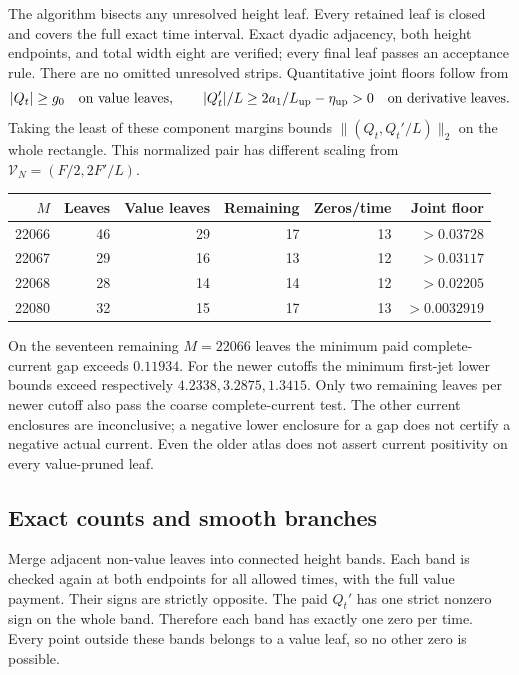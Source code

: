\documentclass[11pt]{article}
\numberwithin{equation}{section}
\theoremstyle{definition}
\theoremstyle{remark}
\begin{document}
The algorithm bisects any unresolved height leaf. Every retained leaf
is closed and covers the full exact time interval. Exact dyadic
adjacency, both height endpoints, and total width eight are verified;
every final leaf passes an acceptance rule. There are no omitted
unresolved strips. Quantitative joint floors follow from
\begin{equation}
 |Q_t|\ge g_0\quad\hbox{on value leaves},\qquad
 |Q_t'|/L\ge 2a_1/L_{\rm up}-\eta_{\rm up}>0
       \quad\hbox{on derivative leaves}.
 \label{eq:joint-floor}
\end{equation}
Taking the least of these component margins bounds
$\|(Q_t,Q_t'/L)\|_2$ on the whole rectangle. This normalized pair
has different scaling from $\mathcal V_N=(F/2,2F'/L)$.

\begin{center}
\small
\begin{tabular}{rrrrrr}
\toprule
$M$ & Leaves & Value leaves & Remaining & Zeros/time & Joint floor\\
\midrule
22066 & 46 & 29 & 17 & 13 & $>0.03728$\\
22067 & 29 & 16 & 13 & 12 & $>0.03117$\\
22068 & 28 & 14 & 14 & 12 & $>0.02205$\\
22080 & 32 & 15 & 17 & 13 & $>0.0032919$\\
\bottomrule
\end{tabular}
\end{center}
On the seventeen remaining $M=22066$ leaves the minimum paid
complete-current gap exceeds $0.11934$. For the newer cutoffs the
minimum first-jet lower bounds exceed respectively
$4.2338,3.2875,1.3415$. Only two remaining leaves per newer cutoff
also pass the coarse complete-current test. The other current
enclosures are inconclusive; a negative lower enclosure for a gap
does not certify a negative actual current. Even the older atlas
does not assert current positivity on every value-pruned leaf.

\subsection{Exact counts and smooth branches}
Merge adjacent non-value leaves into connected height bands. Each
band is checked again at both endpoints for all allowed times, with
the full value payment. Their signs are strictly opposite. The paid
$Q_t'$ has one strict nonzero sign on the whole band. Therefore
each band has exactly one zero per time. Every point outside these
bands belongs to a value leaf, so no other zero is possible.
\end{document}
